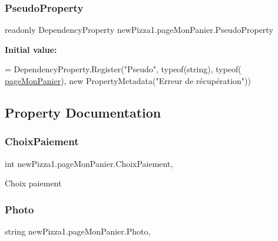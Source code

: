 \subsubsection{\texorpdfstring{Pseudo\+Property}{PseudoProperty}}
{\footnotesize\ttfamily readonly Dependency\+Property new\+Pizza1.\+page\+Mon\+Panier.\+Pseudo\+Property\hspace{0.3cm}{\ttfamily [static]}}

{\bfseries Initial value\+:}
\begin{DoxyCode}
=
            DependencyProperty.Register(\textcolor{stringliteral}{"Pseudo"}, typeof(\textcolor{keywordtype}{string}), typeof(
      \hyperlink{classnewPizza1_1_1pageMonPanier_ab752a6df6a2baf4cac209d7ded9b8cb9}{pageMonPanier}), \textcolor{keyword}{new} PropertyMetadata(\textcolor{stringliteral}{"Erreur de récupération"}))
\end{DoxyCode}


\subsection{Property Documentation}
\mbox{\label{classnewPizza1_1_1pageMonPanier_a7fc71b5e84ef5b4cfc6d9e9cacc3ac2a}} 
\subsubsection{\texorpdfstring{Choix\+Paiement}{ChoixPaiement}}
{\footnotesize\ttfamily int new\+Pizza1.\+page\+Mon\+Panier.\+Choix\+Paiement\hspace{0.3cm}{\ttfamily [get]}, {\ttfamily [set]}}



Choix paiement 

\mbox{\label{classnewPizza1_1_1pageMonPanier_a9d92e585ab933b780bc030bc1796010c}} 
\subsubsection{\texorpdfstring{Photo}{Photo}}
{\footnotesize\ttfamily string new\+Pizza1.\+page\+Mon\+Panier.\+Photo\hspace{0.3cm}{\ttfamily [get]}, {\ttfamily [set]}}



